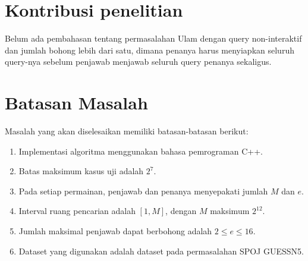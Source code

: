 \section{Kontribusi penelitian}

Belum ada pembahasan tentang permasalahan Ulam dengan query non-interaktif dan jumlah bohong lebih dari satu, dimana penanya harus menyiapkan seluruh query-nya sebelum penjawab menjawab seluruh query penanya sekaligus.


\section{Batasan Masalah}
Masalah yang akan diselesaikan memiliki batasan-batasan berikut:

\begin{enumerate}
  \item Implementasi algoritma menggunakan bahasa pemrograman C++.
  \item Batas maksimum kasus uji adalah $2^7$.
  \item Pada setiap permainan, penjawab dan penanya menyepakati jumlah $M$ dan $e$.
  \item Interval ruang pencarian adalah $[1,M]$, dengan $M$ maksimum $2^{12}$.
  \item Jumlah maksimal penjawab dapat berbohong adalah $2 \leq e \leq 16$.
  \item Dataset yang digunakan adalah dataset pada permasalahan SPOJ GUESSN5.
\end{enumerate}
